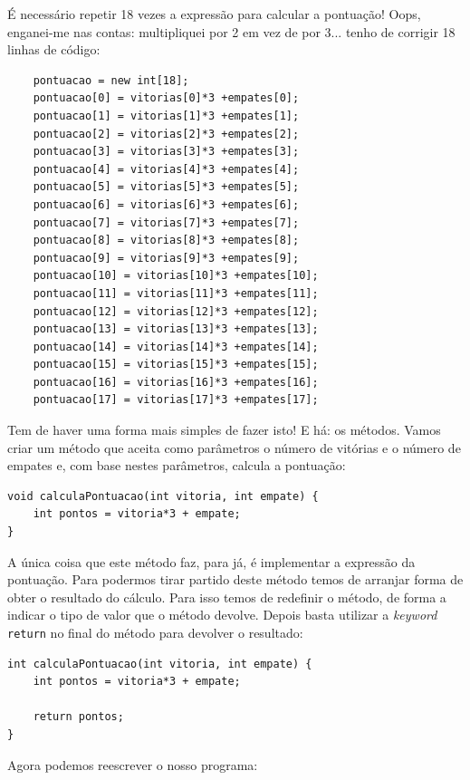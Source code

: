 É necessário repetir 18 vezes a expressão para calcular a pontuação! Oops, enganei-me nas contas: multipliquei por 2 em vez de por 3... tenho de corrigir 18 linhas de código:
\begin{lstlisting}
    pontuacao = new int[18];
    pontuacao[0] = vitorias[0]*3 +empates[0];
    pontuacao[1] = vitorias[1]*3 +empates[1];
    pontuacao[2] = vitorias[2]*3 +empates[2];
    pontuacao[3] = vitorias[3]*3 +empates[3];
    pontuacao[4] = vitorias[4]*3 +empates[4];
    pontuacao[5] = vitorias[5]*3 +empates[5];                
    pontuacao[6] = vitorias[6]*3 +empates[6];
    pontuacao[7] = vitorias[7]*3 +empates[7];
    pontuacao[8] = vitorias[8]*3 +empates[8];
    pontuacao[9] = vitorias[9]*3 +empates[9];
    pontuacao[10] = vitorias[10]*3 +empates[10];
    pontuacao[11] = vitorias[11]*3 +empates[11];                        
    pontuacao[12] = vitorias[12]*3 +empates[12];                        
    pontuacao[13] = vitorias[13]*3 +empates[13];                        
    pontuacao[14] = vitorias[14]*3 +empates[14];                        
    pontuacao[15] = vitorias[15]*3 +empates[15];                        
    pontuacao[16] = vitorias[16]*3 +empates[16];                        
    pontuacao[17] = vitorias[17]*3 +empates[17]; 
\end{lstlisting}
Tem de haver uma forma mais simples de fazer isto! E há: os métodos. Vamos criar um método que aceita como parâmetros o número de vitórias e o número de empates e, com base nestes parâmetros, calcula a pontuação:
\begin{lstlisting}
void calculaPontuacao(int vitoria, int empate) {
    int pontos = vitoria*3 + empate;
}
\end{lstlisting}
A única coisa que este método faz, para já, é implementar a expressão da pontuação. Para podermos tirar partido deste método temos de arranjar forma de obter o resultado do cálculo. Para isso temos de redefinir o método, de forma a indicar o tipo de valor que o método devolve. Depois basta utilizar a \emph{keyword} \texttt{return} no final do método para devolver o resultado:
\begin{lstlisting}
int calculaPontuacao(int vitoria, int empate) {
    int pontos = vitoria*3 + empate;
    
    return pontos;
}
\end{lstlisting}
Agora podemos reescrever o nosso programa:
